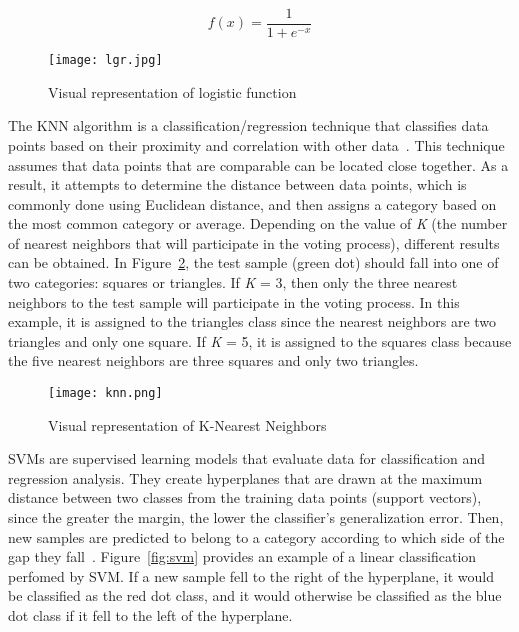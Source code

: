 \begin{equation}\label{eq:5}
    f(x) = \frac{1}{1+e^{-x}}
\end{equation}

\begin{figure}[htbp]
    \centering
    \texttt{[image: lgr.jpg]}
    \caption{Visual representation of logistic function~\cite{Nasteski2017AnMethods}}
    \label{fig:lgr}
\end{figure}


The \gls{KNN} algorithm is a classification/regression technique that classifies data points based on their proximity and correlation with other data~\cite{2020WhatIBM}. This technique assumes that data points that are comparable can be located close together. As a result, it attempts to determine the distance between data points, which is commonly done using Euclidean distance, and then assigns a category based on the most common category or average. Depending on the value of \textit{K} (the number of nearest neighbors that will participate in the voting process), different results can be obtained. In Figure~\ref{fig:knn}, the test sample (green dot) should fall into one of two categories: squares or triangles. If \textit{K} = 3, then only the three nearest neighbors to the test sample will participate in the voting process. In this example, it is assigned to the triangles class since the nearest neighbors are two triangles and only one square. If \textit{K} = 5, it is assigned to the squares class because the five nearest neighbors are three squares and only two triangles.

\begin{figure}[htbp]
    \centering
    \texttt{[image: knn.png]}
    \caption{Visual representation of K-Nearest Neighbors~\cite{Bronshtein2017AMedium}}
    \label{fig:knn}
\end{figure}

\gls{SVM}s are supervised learning models that evaluate data for classification and regression analysis. They create hyperplanes that are drawn at the maximum distance between two classes from the training data points (support vectors), since the greater the margin, the lower the classifier's generalization error. Then, new samples are predicted to belong to a category according to which side of the gap they fall~\cite{Mahesh2019MachineReview}. Figure~\ref{fig:svm} provides an example of a linear classification perfomed by \gls{SVM}. If a new sample fell to the right of the hyperplane, it would be classified as the red dot class, and it would otherwise be classified as the blue dot class if it fell to the left of the hyperplane. 

